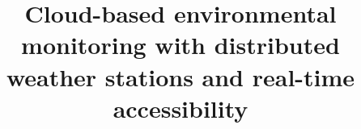 \title{Cloud-based environmental monitoring with distributed weather stations and real-time accessibility}
